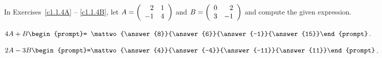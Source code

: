 \documentclass{ximera}
\begin{document}
\noindent In Exercises~\ref{c1.1.4A} -- \ref{c1.1.4B}, let
$A=\left(\begin{array}{rr} 2 & 1\\ -1 &4\end{array}\right)$ and $B=\left(\begin{array}{rr} 0 & 2\\ 3 &-1\end{array}\right)$ and compute the given 
expression.
\begin{exercise}  \label{c1.1.4A}
  $4A+B\begin{prompt}= \mattwo{\answer{8}}{\answer{6}}{\answer{-1}}{\answer{15}}\end{prompt}$.
\end{exercise}
\begin{exercise}  \label{c1.1.4B}
  $2A-3B\begin{prompt}=\mattwo{\answer{4}}{\answer{-4}}{\answer{-11}}{\answer{11}}\end{prompt}$.
\end{exercise}
\end{document}
